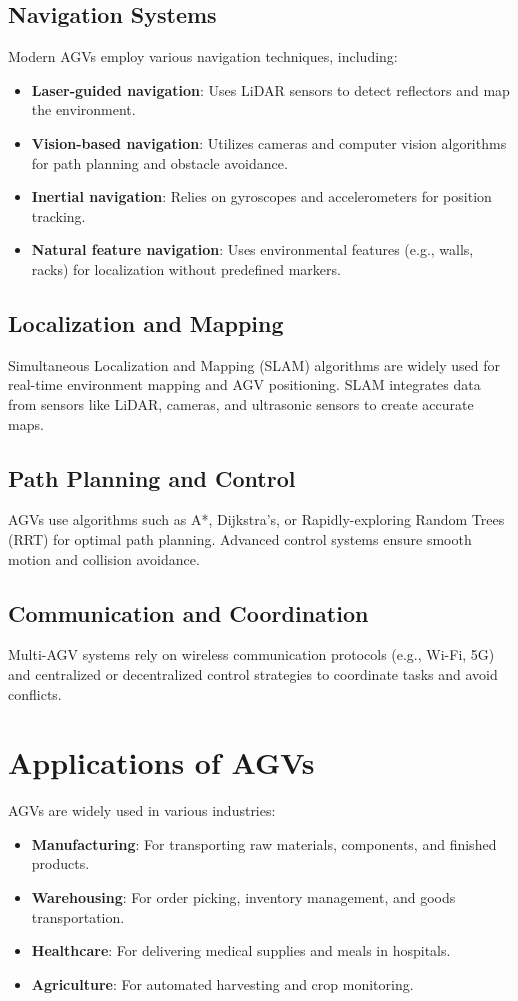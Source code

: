 \documentclass[main]{subfiles}
\begin{document}
\subsection{Navigation Systems}
Modern AGVs employ various navigation techniques, including:
\begin{itemize}
    \item \textbf{Laser-guided navigation}: Uses LiDAR sensors to detect reflectors and map the environment.
    \item \textbf{Vision-based navigation}: Utilizes cameras and computer vision algorithms for path planning and obstacle avoidance.
    \item \textbf{Inertial navigation}: Relies on gyroscopes and accelerometers for position tracking.
    \item \textbf{Natural feature navigation}: Uses environmental features (e.g., walls, racks) for localization without predefined markers.
\end{itemize}

\subsection{Localization and Mapping}
Simultaneous Localization and Mapping (SLAM) algorithms are widely used for real-time environment mapping and AGV positioning. SLAM integrates data from sensors like LiDAR, cameras, and ultrasonic sensors to create accurate maps.

\subsection{Path Planning and Control}
AGVs use algorithms such as A*, Dijkstra's, or Rapidly-exploring Random Trees (RRT) for optimal path planning. Advanced control systems ensure smooth motion and collision avoidance.

\subsection{Communication and Coordination}
Multi-AGV systems rely on wireless communication protocols (e.g., Wi-Fi, 5G) and centralized or decentralized control strategies to coordinate tasks and avoid conflicts.

\section{Applications of AGVs}
AGVs are widely used in various industries:
\begin{itemize}
    \item \textbf{Manufacturing}: For transporting raw materials, components, and finished products.
    \item \textbf{Warehousing}: For order picking, inventory management, and goods transportation.
    \item \textbf{Healthcare}: For delivering medical supplies and meals in hospitals.
    \item \textbf{Agriculture}: For automated harvesting and crop monitoring.
\end{itemize}
\end{document}
